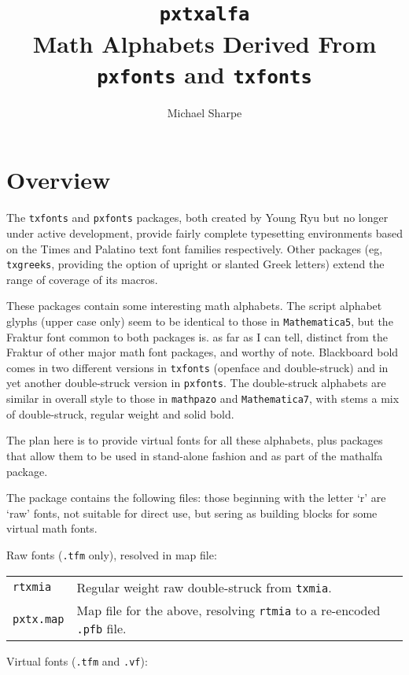 \documentclass[11pt]{amsart}
\title{{\tt\large pxtxalfa}\\Math Alphabets Derived From {\tt\large pxfonts} and {\tt\large txfonts}}
\author{Michael Sharpe}
\begin{document}
\maketitle
\section{Overview}
The {\tt txfonts} and {\tt pxfonts} packages, both created by Young Ryu but no longer under  active development, provide fairly complete typesetting environments based on the Times and Palatino text font families respectively. Other packages (eg, {\tt txgreeks}, providing the option of upright or slanted Greek letters) extend the range of coverage of its macros. 

These packages contain some interesting math alphabets. The script alphabet glyphs (upper case only) seem to be identical to those in {\tt Mathematica5}, but the Fraktur font common to both packages is. as far as I can tell,  distinct from the Fraktur of other major math font packages, and worthy of note. Blackboard bold comes in two different versions in {\tt txfonts} (openface and double-struck) and in yet another double-struck version in {\tt pxfonts}. The double-struck alphabets are similar in overall style to those in {\tt mathpazo} and {\tt Mathematica7}, with stems a mix of double-struck, regular weight  and solid bold.

The plan here is to provide virtual fonts for all these alphabets, plus packages that allow them to be used in stand-alone fashion and as part of the \textsf{mathalfa} package.

The package contains the following files: those beginning with the letter `r' are `raw' fonts, not suitable for direct use, but sering as building blocks for some virtual math fonts.

Raw fonts ({\tt .tfm} only), resolved in map file:

\begin{tabular}{lll}
{\tt rtxmia}&Regular weight raw double-struck from {\tt txmia}.\\
{\tt pxtx.map}&Map file for the above, resolving {\tt rtmia} to a re-encoded {\tt.pfb} file.
\end{tabular}

Virtual fonts ({\tt.tfm} and {\tt.vf}):
\end{document}
